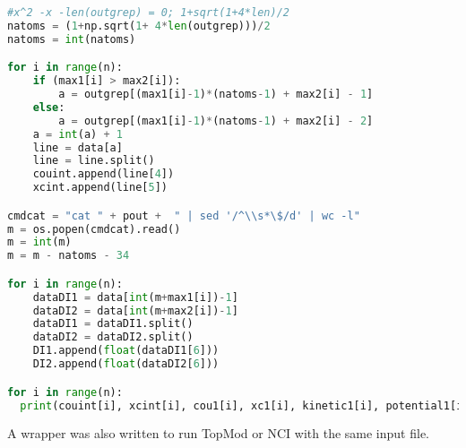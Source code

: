 \begin{lstlisting}[language=Python]
#x^2 -x -len(outgrep) = 0; 1+sqrt(1+4*len)/2
natoms = (1+np.sqrt(1+ 4*len(outgrep)))/2
natoms = int(natoms)

for i in range(n):
	if (max1[i] > max2[i]):
		a = outgrep[(max1[i]-1)*(natoms-1) + max2[i] - 1]
	else:
		a = outgrep[(max1[i]-1)*(natoms-1) + max2[i] - 2]
	a = int(a) + 1
	line = data[a]
	line = line.split()
	couint.append(line[4])
	xcint.append(line[5])

cmdcat = "cat " + pout +  " | sed '/^\\s*\$/d' | wc -l"
m = os.popen(cmdcat).read()
m = int(m)
m = m - natoms - 34

for i in range(n):
	dataDI1 = data[int(m+max1[i])-1]
	dataDI2 = data[int(m+max2[i])-1]
	dataDI1 = dataDI1.split()
	dataDI2 = dataDI2.split()
	DI1.append(float(dataDI1[6]))
	DI2.append(float(dataDI2[6]))

for i in range(n):
  print(couint[i], xcint[i], cou1[i], xc1[i], kinetic1[i], potential1[i], DI1[i], cou2[i], xc2[i], kinetic2[i], potential2[i], DI2[i])
\end{lstlisting}

A wrapper was also written to run TopMod or NCI with the same input file.

